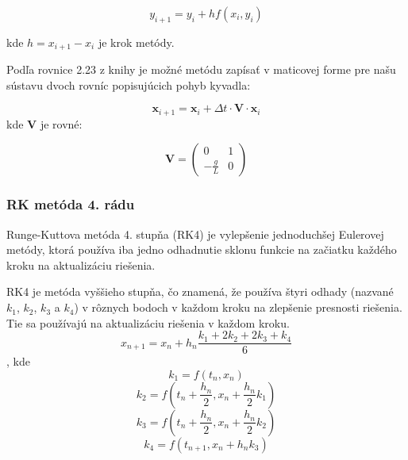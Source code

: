 \documentclass{article}
\theoremstyle{definition}
\theoremstyle{remark}
\begin{document}
\begin{equation}
y_{i+1}=y_i+h f(x_i,y_i)
\end{equation}


kde $h = x_{i+1}-x_i$ je krok metódy.

Podľa rovnice 2.23 z knihy \cite{Zukovic} je možné metódu zapísať v maticovej forme pre našu sústavu dvoch rovníc popisujúcich pohyb kyvadla:


\begin{equation}
    \mathbf{x}_{i+1} = \mathbf{x}_{i} + \Delta t \cdot \mathbf{V} \cdot \mathbf{x}_{i}
\end{equation}
kde $\mathbf{V}$ je rovné:

\begin{equation}
    \mathbf{V} = \begin{pmatrix}
    0 & 1 \\
    -\frac{g}{L} & 0
    \end{pmatrix}
\end{equation}
\subsubsection{RK metóda 4. rádu}
Runge-Kuttova metóda 4. stupňa (RK4) je vylepšenie jednoduchšej Eulerovej metódy, ktorá používa iba jedno odhadnutie sklonu funkcie na začiatku každého kroku na aktualizáciu riešenia.


RK4 je metóda vyššieho stupňa, čo znamená, že používa štyri odhady (nazvané $k_1$, $k_2$, $k_3$ a $k_4$) v rôznych bodoch v každom kroku na zlepšenie presnosti riešenia. Tie sa používajú na aktualizáciu riešenia v každom kroku.\cite{Zukovic}
\begin{equation}
    x_{n+1}= x_n + h_n \frac{k_1+2k_2+2k_3+k_4 }{6}
\end{equation}
, kde
$$k_1=f(t_n,x_n)$$
$$k_2=f(t_n+\frac{h_n}{2},x_n+\frac{h_n}{2}k_1)$$
$$k_3=f(t_n+\frac{h_n}{2},x_n+\frac{h_n}{2}k_2)$$
$$k_4=f(t_{n+1},x_n+{h_n}k_3)$$
\end{document}

